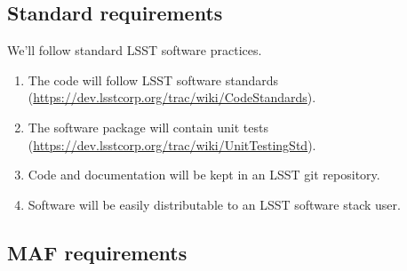 \documentclass[11pt, preprint]{aastex}
\begin{document}
\subsection{Standard requirements}

We'll follow standard LSST software practices. 

\begin{enumerate}
\item{The code will follow LSST software standards (\url{https://dev.lsstcorp.org/trac/wiki/CodeStandards}).}
\item{The software package will contain unit tests (\url{https://dev.lsstcorp.org/trac/wiki/UnitTestingStd}).}
\item{Code and documentation will be kept in an LSST git repository.}
\item{Software will be easily distributable to an LSST software stack user.}
\end{enumerate}


\subsection{MAF requirements}
\end{document}
